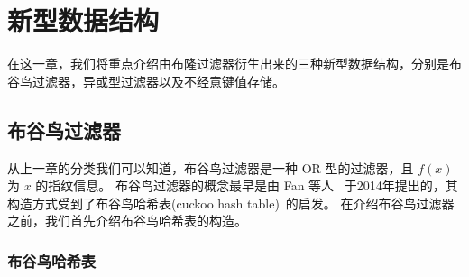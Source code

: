 
\chapter{新型数据结构}\label{chp:data_structure}

在这一章，我们将重点介绍由布隆过滤器衍生出来的三种新型数据结构，分别是布谷鸟过滤器，异或型过滤器以及不经意键值存储。

\section{布谷鸟过滤器}

从上一章的分类我们可以知道，布谷鸟过滤器是一种 OR 型的过滤器，且 $f(x)$ 为 $x$ 的指纹信息。
布谷鸟过滤器的概念最早是由 Fan 等人~\cite{fan2014cuckoo} 于2014年提出的，其构造方式受到了布谷鸟哈希表(cuckoo hash table)~\cite{pagh2004cuckoo}的启发。
在介绍布谷鸟过滤器之前，我们首先介绍布谷鸟哈希表的构造。

\subsection{布谷鸟哈希表}

